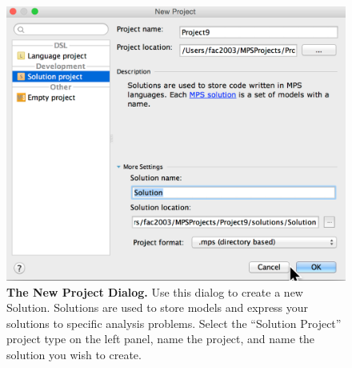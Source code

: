 \begin{figure}
  \includegraphics[width=\figWidthNarrow]{figures/NewSolutionWizard.png}
  \caption[The New Project Dialog.]{\textbf{The New Project Dialog.} Use this dialog to create a new Solution. Solutions are used to store models and express your solutions to specific analysis problems. Select the ``Solution Project'' project type on the left panel, name the project, and name the solution you wish to create.
}
\end{figure}\label{fig:NewProjectDialog}

